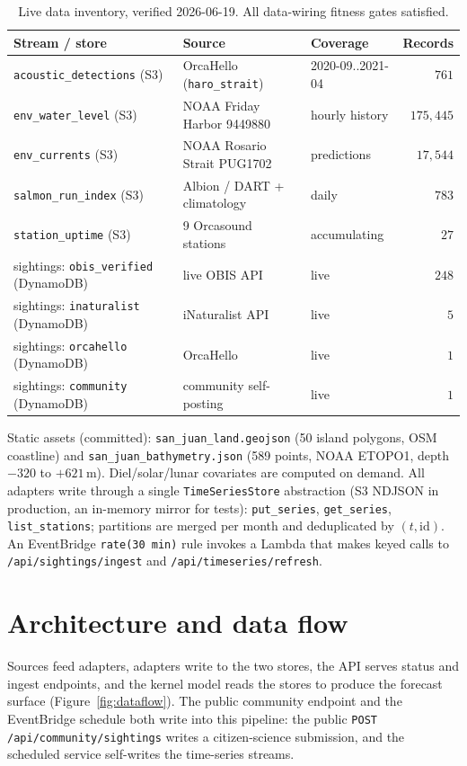 \documentclass[11pt]{article}
\begin{document}
\begin{table}[ht]
  \centering
  \small
  \begin{tabular}{@{}lllr@{}}
    \toprule
    Stream / store & Source & Coverage & Records \\
    \midrule
    \texttt{acoustic\_detections} (S3) & OrcaHello (\texttt{haro\_strait}) & 2020-09..2021-04 & $761$ \\
    \texttt{env\_water\_level} (S3) & NOAA Friday Harbor 9449880 & hourly history & $175{,}445$ \\
    \texttt{env\_currents} (S3) & NOAA Rosario Strait PUG1702 & predictions & $17{,}544$ \\
    \texttt{salmon\_run\_index} (S3) & Albion / DART + climatology & daily & $783$ \\
    \texttt{station\_uptime} (S3) & 9 Orcasound stations & accumulating & $27$ \\
    sightings: \texttt{obis\_verified} (DynamoDB) & live OBIS API & live & $248$ \\
    sightings: \texttt{inaturalist} (DynamoDB) & iNaturalist API & live & $5$ \\
    sightings: \texttt{orcahello} (DynamoDB) & OrcaHello & live & $1$ \\
    sightings: \texttt{community} (DynamoDB) & community self-posting & live & $1$ \\
    \bottomrule
  \end{tabular}
  \caption{Live data inventory, verified 2026-06-19. All data-wiring fitness
  gates satisfied.}
  \label{tab:data}
\end{table}

Static assets (committed): \texttt{san\_juan\_land.geojson} (50 island polygons,
OSM coastline) and \texttt{san\_juan\_bathymetry.json} (589 points, NOAA ETOPO1,
depth $-320$ to $+621$\,m). Diel/solar/lunar covariates are computed on demand.
All adapters write through a single \texttt{TimeSeriesStore} abstraction (S3
NDJSON in production, an in-memory mirror for tests): \texttt{put\_series},
\texttt{get\_series}, \texttt{list\_stations}; partitions are merged per month
and deduplicated by $(t, \mathrm{id})$. An EventBridge \texttt{rate(30 min)} rule
invokes a Lambda that makes keyed calls to \texttt{/api/sightings/ingest} and
\texttt{/api/timeseries/refresh}.

\section{Architecture and data flow}
Sources feed adapters, adapters write to the two stores, the API serves status
and ingest endpoints, and the kernel model reads the stores to produce the
forecast surface (Figure~\ref{fig:dataflow}). The public community endpoint and
the EventBridge schedule both write into this pipeline: the public
\texttt{POST /api/community/sightings} writes a citizen-science submission, and
the scheduled service self-writes the time-series streams.
\end{document}
